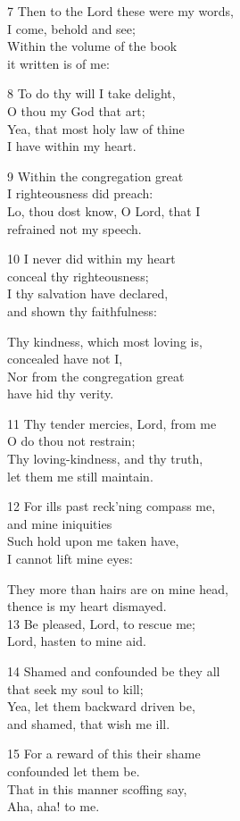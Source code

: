 \begin{multicols}{3}
7 Then to the Lord these were my words,\\
I come, behold and see;\\
Within the volume of the book\\
it written is of me:

8 To do thy will I take delight,\\
O thou my God that art;\\
Yea, that most holy law of thine\\
I have within my heart.

9 Within the congregation great\\
I righteousness did preach:\\
Lo, thou dost know, O Lord, that I\\
refrained not my speech.

10 I never did within my heart\\
conceal thy righteousness;\\
I thy salvation have declared,\\
and shown thy faithfulness:

Thy kindness, which most loving is,\\
concealed have not I,\\
Nor from the congregation great\\
have hid thy verity.

11 Thy tender mercies, Lord, from me\\
O do thou not restrain;\\
Thy loving-kindness, and thy truth,\\
let them me still maintain.

12 For ills past reck’ning compass me,\\
and mine iniquities\\
Such hold upon me taken have,\\
I cannot lift mine eyes:

They more than hairs are on mine head,\\
thence is my heart dismayed.\\
13 Be pleased, Lord, to rescue me;\\
Lord, hasten to mine aid.

14 Shamed and confounded be they all\\
that seek my soul to kill;\\
Yea, let them backward driven be,\\
and shamed, that wish me ill.

15 For a reward of this their shame\\
confounded let them be.\\
That in this manner scoffing say,\\
Aha, aha! to me.


\end{multicols}
